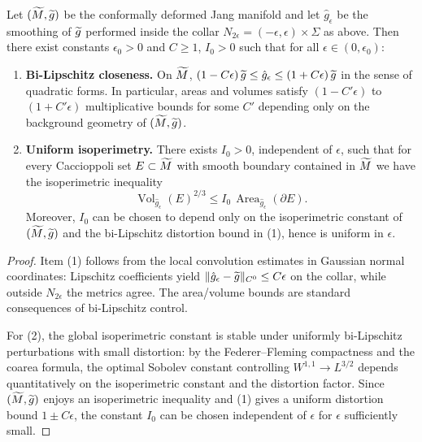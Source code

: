 \begin{proposition}\label{prop:UniformIsoperimetry}
Let $(\widetilde{M},\widetilde{g})$ be the conformally deformed Jang manifold and let $\hat g_\epsilon$ be the smoothing of $\widetilde{g}$ performed inside the collar $N_{2\epsilon}=(-\epsilon,\epsilon)\times\Sigma$ as above. Then there exist constants $\epsilon_0>0$ and $C\ge 1$, $I_0>0$ such that for all $\epsilon\in(0,\epsilon_0)$:
\begin{enumerate}
    \item \textbf{Bi-Lipschitz closeness.} On $\widetilde{M}$, $(1-C\epsilon)\,\widetilde{g} \le \hat g_\epsilon \le (1+C\epsilon)\,\widetilde{g}$ in the sense of quadratic forms. In particular, areas and volumes satisfy $(1-C'\epsilon)$ to $(1+C'\epsilon)$ multiplicative bounds for some $C'$ depending only on the background geometry of $(\widetilde{M},\widetilde{g})$.
    \item \textbf{Uniform isoperimetry.} There exists $I_0>0$, independent of $\epsilon$, such that for every Caccioppoli set $E\subset \widetilde{M}$ with smooth boundary contained in $\widetilde{M}$ we have the isoperimetric inequality
    \[
        \operatorname{Vol}_{\hat g_\epsilon}(E)^{2/3} \le I_0\, \operatorname{Area}_{\hat g_\epsilon}(\partial E).
    \]
    Moreover, $I_0$ can be chosen to depend only on the isoperimetric constant of $(\widetilde{M},\widetilde{g})$ and the bi-Lipschitz distortion bound in (1), hence is uniform in $\epsilon$.
\end{enumerate}
\end{proposition}
\begin{proof}
Item (1) follows from the local convolution estimates in Gaussian normal coordinates: Lipschitz coefficients yield $\|\hat g_\epsilon-\widetilde{g}\|_{C^0}\le C\epsilon$ on the collar, while outside $N_{2\epsilon}$ the metrics agree. The area/volume bounds are standard consequences of bi-Lipschitz control.

For (2), the global isoperimetric constant is stable under uniformly bi-Lipschitz perturbations with small distortion: by the Federer--Fleming compactness and the coarea formula, the optimal Sobolev constant controlling $W^{1,1}\to L^{3/2}$ depends quantitatively on the isoperimetric constant and the distortion factor. Since $(\widetilde{M},\widetilde{g})$ enjoys an isoperimetric inequality and (1) gives a uniform distortion bound $1\pm C\epsilon$, the constant $I_0$ can be chosen independent of $\epsilon$ for $\epsilon$ sufficiently small.
\end{proof}

